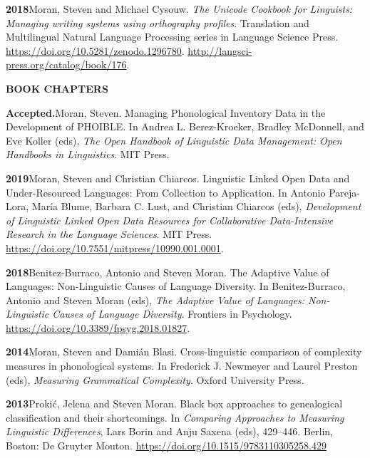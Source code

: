 \documentclass[11pt]{article}
\newcommand{\hangpara}{
 \setlength{\parindent}{0in} %
 \hangindent=0.42in %
}
\begin{document}
\hangpara
{\bf 2018}\hspace{1ex}Moran, Steven and Michael Cysouw. {\it The Unicode Cookbook for Linguists: Managing writing systems using orthography profiles}. Translation and Multilingual Natural Language Processing series in Language Science Press. \url{https://doi.org/10.5281/zenodo.1296780}. \url{http://langsci-press.org/catalog/book/176}.


\vskip 20pt
\begin{flushleft}
{\bf BOOK CHAPTERS}
\end{flushleft}

\hangpara{\bf Accepted.}\hspace{1ex}Moran, Steven. Managing Phonological Inventory Data in the Development of PHOIBLE. In Andrea L. Berez-Kroeker, Bradley McDonnell, and Eve Koller (eds), \textit{The Open Handbook of Linguistic Data Management: Open Handbooks in Linguistics}. MIT Press.

\vskip 6pt
\hangpara
{\bf 2019}\hspace{1ex}Moran, Steven and Christian Chiarcos. Linguistic Linked Open Data and Under-Resourced Languages: From Collection to Application. In Antonio Pareja-Lora, María Blume, Barbara C. Lust, and Christian Chiarcos (eds), \textit{Development of Linguistic Linked Open Data Resources for Collaborative Data-Intensive Research in the Language Sciences}. MIT Press. \url{https://doi.org/10.7551/mitpress/10990.001.0001}.


\vskip 6pt
\hangpara
{\bf 2018}\hspace{1ex}Benitez-Burraco, Antonio and Steven Moran. The Adaptive Value of Languages: Non-Linguistic Causes of Language Diversity. In Benitez-Burraco, Antonio and Steven Moran (eds), \textit{The Adaptive Value of Languages: Non-Linguistic Causes of Language Diversity}. Frontiers in Psychology. \url{https://doi.org/10.3389/fpsyg.2018.01827}.

\vskip 6pt
\hangpara
{\bf 2014}\hspace{1ex}Moran, Steven and Dami{\'a}n Blasi. Cross-linguistic comparison of complexity measures in phonological systems. In Frederick J. Newmeyer and Laurel Preston (eds), {\it Measuring Grammatical Complexity}. Oxford University Press. 

\vskip 6pt
\hangpara
{\bf 2013}\hspace{1ex}Proki{\'c}, Jelena and Steven Moran. Black box approaches to genealogical classification and their shortcomings. In {\it Comparing Approaches to Measuring Linguistic Differences}, Lars Borin and Anju Saxena (eds), 429--446. Berlin, Boston: De Gruyter Mouton. \url{https://doi.org/10.1515/9783110305258.429}
\end{document}
